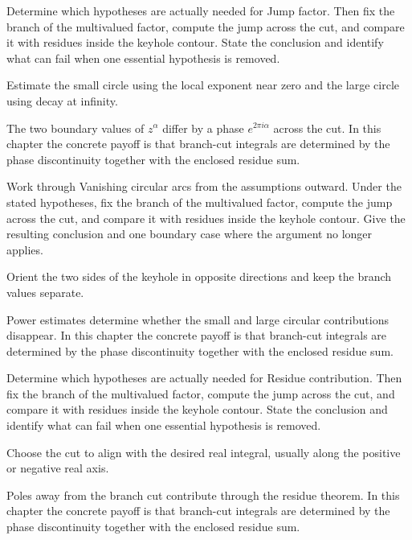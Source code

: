 \begin{exercise}\label{exr:iv21-03}
Determine which hypotheses are actually needed for Jump factor. Then fix the branch of the multivalued factor, compute the jump across the cut, and compare it with residues inside the keyhole contour. State the conclusion and identify what can fail when one essential hypothesis is removed.
\end{exercise}
\begin{hint}
Estimate the small circle using the local exponent near zero and the large circle using decay at infinity.
\end{hint}
\begin{solution}
The two boundary values of $z^\alpha$ differ by a phase $e^{2\pi i\alpha}$ across the cut. In this chapter the concrete payoff is that branch-cut integrals are determined by the phase discontinuity together with the enclosed residue sum.
\end{solution}

\begin{exercise}\label{exr:iv21-04}
Work through Vanishing circular arcs from the assumptions outward. Under the stated hypotheses, fix the branch of the multivalued factor, compute the jump across the cut, and compare it with residues inside the keyhole contour. Give the resulting conclusion and one boundary case where the argument no longer applies.
\end{exercise}
\begin{hint}
Orient the two sides of the keyhole in opposite directions and keep the branch values separate.
\end{hint}
\begin{solution}
Power estimates determine whether the small and large circular contributions disappear. In this chapter the concrete payoff is that branch-cut integrals are determined by the phase discontinuity together with the enclosed residue sum.
\end{solution}

\begin{exercise}\label{exr:iv21-05}
Determine which hypotheses are actually needed for Residue contribution. Then fix the branch of the multivalued factor, compute the jump across the cut, and compare it with residues inside the keyhole contour. State the conclusion and identify what can fail when one essential hypothesis is removed.
\end{exercise}
\begin{hint}
Choose the cut to align with the desired real integral, usually along the positive or negative real axis.
\end{hint}
\begin{solution}
Poles away from the branch cut contribute through the residue theorem. In this chapter the concrete payoff is that branch-cut integrals are determined by the phase discontinuity together with the enclosed residue sum.
\end{solution}

